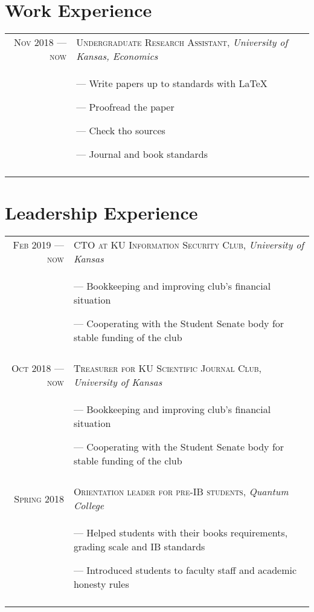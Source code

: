 \documentclass[a4paper,10pt]{article}
\begin{document}
\section{Work Experience}
\begin{tabular}{r|p{11cm}}

  \textsc{Nov 2018 --- now} &  \textsc{Undergraduate Research Assistant}, \emph{University of Kansas, Economics}\\&\footnotesize{
  --- Write papers up to standards with \LaTeX{}

  --- Proofread the paper

  --- Check tho sources

  --- Journal and book standards
  } \\\multicolumn{2}{c}{}\\
  \end{tabular}
\section{Leadership Experience}
\begin{tabular}{r|p{11cm}}

  \textsc{Feb 2019 --- now} &  \textsc{CTO at KU Information Security Club}, \emph{University of Kansas}\\&\footnotesize{
  --- Bookkeeping and improving club's financial situation 

  --- Cooperating with the Student Senate body for stable funding of the club
  } \\\multicolumn{2}{c}{}\\
  
  \textsc{Oct 2018 --- now} &  \textsc{Treasurer for KU Scientific Journal Club}, \emph{University of Kansas}\\&\footnotesize{
  --- Bookkeeping and improving club's financial situation 

  --- Cooperating with the Student Senate body for stable funding of the club
  } \\\multicolumn{2}{c}{}\\
  
  \textsc{Spring 2018} &  \textsc{Orientation leader for pre-IB students}, \emph{Quantum College}\\&\footnotesize{
  --- Helped students with their books requirements, grading scale and IB standards

  --- Introduced students to faculty staff and academic honesty rules
  } \\\multicolumn{2}{c}{}\\  
\end{tabular}
\end{document}
